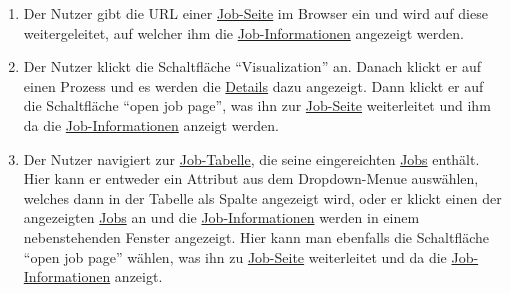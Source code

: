 \begin{enumerate}
   

\item Der \gls{Nutzer} gibt die URL einer \hyperref[pages:job-page]{Job-Seite} im Browser ein und wird auf diese weitergeleitet, auf welcher ihm die \hyperref[B:Job-Informationen]{Job-Informationen} angezeigt werden.

\item Der \gls{Nutzer} klickt die Schaltfläche \enquote{Visualization} an. Danach klickt er auf einen \gls{Prozess} und es werden die \hyperref[B:Job-Details]{Details} dazu angezeigt. Dann klickt er auf die Schaltfläche \enquote{open job page}, was ihn zur \hyperref[pages:job-page]{Job-Seite} weiterleitet und ihm da die \hyperref[B:Job-Informationen]{Job-Informationen} anzeigt werden.

\item Der \gls{Nutzer} navigiert zur \hyperref[pages:job-table]{Job-Tabelle}, die seine eingereichten \hyperref[B:Jobs]{Jobs} enthält. Hier kann er entweder ein Attribut aus dem \gls{Dropdown-Menue} auswählen, welches dann in der Tabelle als Spalte angezeigt wird, oder er klickt einen der angezeigten \hyperref[B:Jobs]{Jobs} an und die \hyperref[B:Job-Informationen]{Job-Informationen} werden in einem nebenstehenden Fenster angezeigt. Hier kann man ebenfalls die Schaltfläche \enquote{open job page} wählen, was ihn zu \hyperref[pages:job-page]{Job-Seite} weiterleitet und da die \hyperref[B:Job-Informationen]{Job-Informationen} anzeigt.
\end{enumerate}